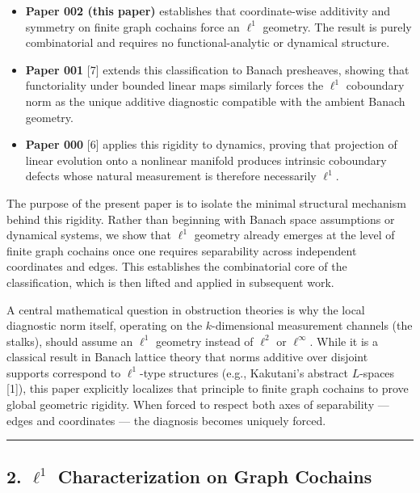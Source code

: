 \documentclass[
]{article}
\providecommand{\tightlist}{%
  \setlength{\itemsep}{0pt}\setlength{\parskip}{0pt}}
\begin{document}
\begin{itemize}
\tightlist
\item
  \textbf{Paper 002 (this paper)} establishes that coordinate-wise
  additivity and symmetry on finite graph cochains force an \(\ell^1\)
  geometry. The result is purely combinatorial and requires no
  functional-analytic or dynamical structure.
\item
  \textbf{Paper 001} {[}7{]} extends this classification to Banach
  presheaves, showing that functoriality under bounded linear maps
  similarly forces the \(\ell^1\) coboundary norm as the unique additive
  diagnostic compatible with the ambient Banach geometry.
\item
  \textbf{Paper 000} {[}6{]} applies this rigidity to dynamics, proving
  that projection of linear evolution onto a nonlinear manifold produces
  intrinsic coboundary defects whose natural measurement is therefore
  necessarily \(\ell^1\).
\end{itemize}

The purpose of the present paper is to isolate the minimal structural
mechanism behind this rigidity. Rather than beginning with Banach space
assumptions or dynamical systems, we show that \(\ell^1\) geometry
already emerges at the level of finite graph cochains once one requires
separability across independent coordinates and edges. This establishes
the combinatorial core of the classification, which is then lifted and
applied in subsequent work.

A central mathematical question in obstruction theories is why the local
diagnostic norm itself, operating on the \(k\)-dimensional measurement
channels (the stalks), should assume an \(\ell^1\) geometry instead of
\(\ell^2\) or \(\ell^\infty\). While it is a classical result in Banach
lattice theory that norms additive over disjoint supports correspond to
\(\ell^1\)-type structures (e.g., Kakutani's abstract \(L\)-spaces
{[}1{]}), this paper explicitly localizes that principle to finite graph
cochains to prove global geometric rigidity. When forced to respect both
axes of separability --- edges and coordinates --- the diagnosis becomes
uniquely forced.

\begin{center}\rule{0.5\linewidth}{0.5pt}\end{center}

\subsection{\texorpdfstring{2. \(\ell^1\) Characterization on Graph
Cochains}{2. \textbackslash ell\^{}1 Characterization on Graph Cochains}}\label{ell1-characterization-on-graph-cochains}
\end{document}
